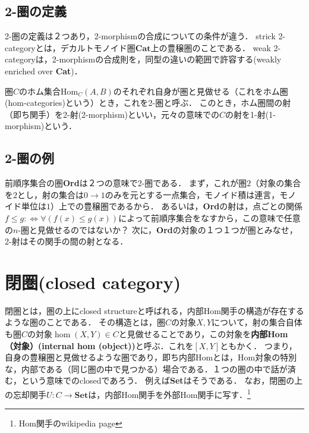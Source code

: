 \documentclass[uplatex, 12pt, dvipdfmx]{jsreport}
\begin{document}
\section{2-圏の定義}
2-圏の定義は２つあり，2-morphismの合成についての条件が違う．
strick 2-categoryとは，デカルトモノイド圏$\mathbf{Cat}$上の豊穣圏のことである．
weak 2-categoryは，2-morphismの合成則を，同型の違いの範囲で許容する(weakly enriched over \textbf{Cat})．
\begin{definition}\rm{}
    圏$C$のホム集合$\mathrm{Hom}_C(A,B)$のそれぞれ自身が圏と見做せる（これをホム圏(hom-categories)という）とき，これを2-圏と呼ぶ．
    このとき，ホム圏間の射（即ち関手）を2-射(2-morphism)といい，元々の意味での$C$の射を1-射(1-morphism)という．
\end{definition}

\begin{definition}
    
\end{definition}

\section{2-圏の例}

前順序集合の圏\textbf{Ord}は２つの意味で2-圏である．
まず，これが圏$2$（対象の集合を$2$とし，射の集合は$0\to 1$のみを元とする一点集合，モノイド積は連言，モノイド単位は$1$）上での豊穣圏であるから．
あるいは，\textbf{Ord}の射は，点ごとの関係$f\le g:\Longleftrightarrow \forall (f(x)\le g(x))$によって前順序集合をなすから，この意味で任意の$n$-圏と見做せるのではないか？
次に，\textbf{Ord}の対象の１つ１つが圏とみなせ，2-射はその関手の間の射となる．

\chapter{閉圏(closed category)}
閉圏とは，圏の上にclosed structureと呼ばれる，内部Hom関手の構造が存在するような圏のことである．
その構造とは，圏$C$の対象$X,Y$について，射の集合自体も圏$C$の対象$\hom(X,Y)\in C$と見做せることであり，この対象を\textbf{内部Hom（対象）(internal hom (object))}と呼ぶ．これを$[X,Y]$ともかく．
つまり，自身の豊穣圏と見做せるような圏であり，即ち内部Homとは，Hom対象の特別な，内部である（同じ圏の中で見つかる）場合である．１つの圏の中で話が済む，という意味でのclosedであろう．
例えば\textbf{Set}はそうである．
なお，閉圏の上の忘却関手$U:C\to\mathbf{Set}$は，内部Hom関手を外部Hom関手に写す．\footnote{Hom関手のwikipedia page}
\end{document}
